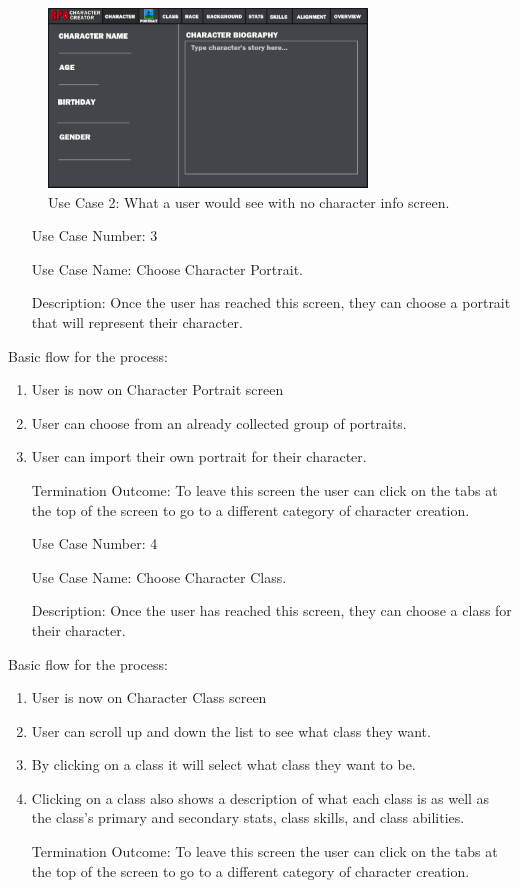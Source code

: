 \documentclass[10pt,conference,onecolumn,compsoc]{IEEEtran}
\begin{document}
\begin{figure}[ht!]
\includegraphics[height=180px, width=320px]{CSCI 352 Interface Mockups/Interface Mockup 4.png}
\caption{Use Case 2: What a user would see with no character info screen.}
\centering
\label{mockup4}
\end{figure}

\begin{itemize}
\item[Use Case Number:] 3
\item[Use Case Name:] Choose Character Portrait.
\item[Description:] Once the user has reached this screen, they can choose a portrait that will represent their character.
\end{itemize}
Basic flow for the process:
\begin{enumerate}
\item User is now on Character Portrait screen
\item User can choose from an already collected group of portraits.
\item User can import their own portrait for their character.
\item[Termination Outcome:] To leave this screen the user can click on the tabs at the top of the screen to go to a different category of character creation.
\end{enumerate}

\begin{itemize}
\item[Use Case Number:] 4
\item[Use Case Name:] Choose Character Class.
\item[Description:] Once the user has reached this screen, they can choose a class for their character.
\end{itemize}
Basic flow for the process:
\begin{enumerate}
\item User is now on Character Class screen
\item User can scroll up and down the list to see what class they want.
\item By clicking on a class it will select what class they want to be.
\item Clicking on a class also shows a description of what each class is as well as the class's primary and secondary stats, class skills, and class abilities.
\item[Termination Outcome:] To leave this screen the user can click on the tabs at the top of the screen to go to a different category of character creation.
\end{enumerate}
\end{document}

